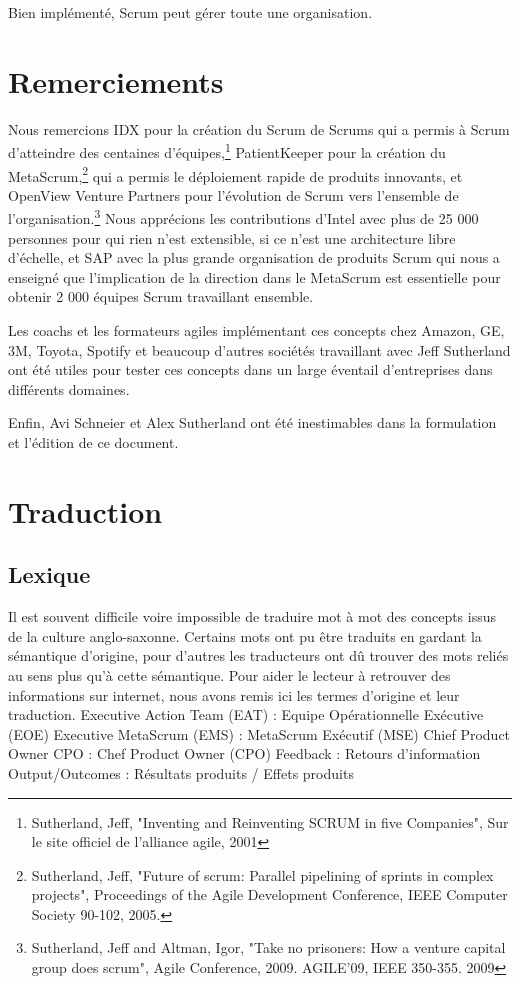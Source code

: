 \documentclass[12pt,a4paper,parskip=full]{scrartcl}
\begin{document}
Bien implémenté, Scrum peut gérer toute une organisation.

\section{Remerciements}
Nous remercions IDX pour la création du Scrum de Scrums qui a permis à Scrum
d'atteindre des centaines d'équipes,\footnote{Sutherland, Jeff,
"Inventing and Reinventing SCRUM in five Companies", Sur le site officiel
de l'alliance agile, 2001} PatientKeeper pour la création du MetaScrum,\footnote{Sutherland, Jeff, "Future of scrum: Parallel pipelining
of sprints in complex projects", Proceedings of the Agile Development
Conference,  IEEE Computer Society 90-102,  2005.} qui a
permis le déploiement rapide de produits innovants, et OpenView Venture Partners pour
l'évolution de Scrum vers l'ensemble de l'organisation.\footnote{Sutherland, Jeff and Altman,
Igor, "Take no prisoners: How a venture capital group does scrum", Agile
Conference, 2009. AGILE'09, IEEE 350-355.  2009} Nous apprécions les contributions
d'Intel avec plus de 25 000 personnes pour qui rien n'est extensible, si ce n'est une
architecture libre d'échelle, et SAP avec la plus grande organisation de produits Scrum qui
nous a enseigné que l'implication de la direction dans le MetaScrum est essentielle pour
obtenir 2 000 équipes Scrum travaillant ensemble.

Les coachs et les formateurs agiles implémentant ces concepts chez Amazon, GE, 3M,
Toyota, Spotify et beaucoup d'autres sociétés travaillant avec Jeff Sutherland ont été utiles
pour tester ces concepts dans un large éventail d'entreprises dans différents domaines.

Enfin, Avi Schneier et Alex Sutherland ont été inestimables dans la formulation 
et l'édition de ce document.

\pagebreak

\printbibliography

\pagebreak

\section{Traduction}
\subsection{Lexique}
Il est souvent difficile voire impossible de traduire mot à mot des concepts issus de la
culture anglo-saxonne. Certains mots ont pu être traduits en gardant la sémantique
d'origine, pour d'autres les traducteurs ont dû trouver des mots reliés au sens plus qu'à
cette sémantique. Pour aider le lecteur à retrouver des informations sur internet, nous
avons remis ici les termes d'origine et leur traduction.
Executive Action Team (EAT) : Equipe Opérationnelle Exécutive (EOE)
Executive MetaScrum (EMS) : MetaScrum Exécutif (MSE)
Chief Product Owner CPO : Chef Product Owner (CPO)
Feedback : Retours d'information
Output/Outcomes : Résultats produits / Effets produits
\end{document}
